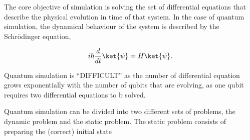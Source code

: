 The core objective of simulation is solving the set of differential equations that describe the physical evolution in time of that system. In the case of quantum simulation, the dynamical behaviour of the system is described by the Schrödinger equation,

$$ i \hbar \frac{d}{dt} \ket{\psi} = H \ket{\psi}.$$

Quantum simulation is ``DIFFICULT'' as the number of differential equation grows exponentially with the number of qubits that are evolving, as one qubit requires two differential equations to b solved.


Quantum simulation can be divided into two different sets of problems, the dynamic problem and the static problem. The static problem consists of preparing the (correct) initial state 

